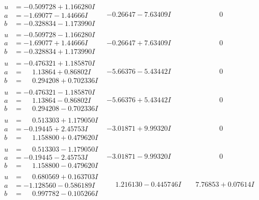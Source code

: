 \documentclass[1p]{elsarticle_modified}
\theoremstyle{definition}
\begin{document}
$$\begin{array}{c|c|c}
\begin{aligned}
u &= -0.509728 + 1.166280 I \\
a &= -1.69077 - 1.44666 I \\
b &= -0.328834 - 1.173990 I\end{aligned}
 & -0.26647 - 7.63409 I & \phantom{-0.000000 } 0 \\ \hline\begin{aligned}
u &= -0.509728 - 1.166280 I \\
a &= -1.69077 + 1.44666 I \\
b &= -0.328834 + 1.173990 I\end{aligned}
 & -0.26647 + 7.63409 I & \phantom{-0.000000 } 0 \\ \hline\begin{aligned}
u &= -0.476321 + 1.185870 I \\
a &= \phantom{-}1.13864 + 0.86802 I \\
b &= \phantom{-}0.294208 + 0.702336 I\end{aligned}
 & -5.66376 - 5.43442 I & \phantom{-0.000000 } 0 \\ \hline\begin{aligned}
u &= -0.476321 - 1.185870 I \\
a &= \phantom{-}1.13864 - 0.86802 I \\
b &= \phantom{-}0.294208 - 0.702336 I\end{aligned}
 & -5.66376 + 5.43442 I & \phantom{-0.000000 } 0 \\ \hline\begin{aligned}
u &= \phantom{-}0.513303 + 1.179050 I \\
a &= -0.19445 + 2.45753 I \\
b &= \phantom{-}1.158800 + 0.479620 I\end{aligned}
 & -3.01871 + 9.99320 I & \phantom{-0.000000 } 0 \\ \hline\begin{aligned}
u &= \phantom{-}0.513303 - 1.179050 I \\
a &= -0.19445 - 2.45753 I \\
b &= \phantom{-}1.158800 - 0.479620 I\end{aligned}
 & -3.01871 - 9.99320 I & \phantom{-0.000000 } 0 \\ \hline\begin{aligned}
u &= \phantom{-}0.680569 + 0.163703 I \\
a &= -1.128560 - 0.586189 I \\
b &= \phantom{-}0.997782 - 0.105266 I\end{aligned}
 & \phantom{-}1.216130 - 0.445746 I & \phantom{-}7.76853 + 0.07614 I\\

\end{array}$$
\end{document}
